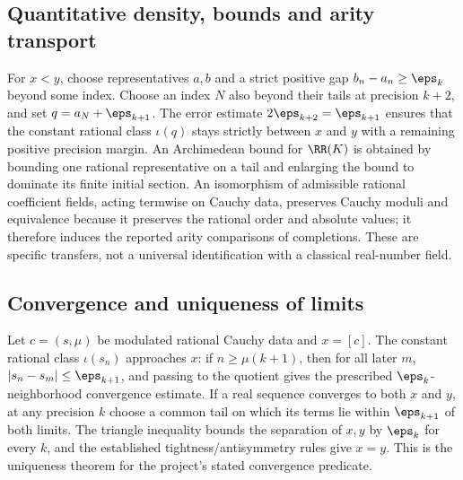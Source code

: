\subsection{Quantitative density, bounds and arity transport}\label{supp:12-7}
\par{}\par\smallskip

For $x<y$, choose representatives $a,b$ and a strict positive gap $b_n-a_n\ge\eps_k$ beyond some index. Choose an index $N$ also beyond their tails at precision $k+2$, and set $q=a_N+\eps_{k+1}$. The error estimate $2\eps_{k+2}=\eps_{k+1}$ ensures that the constant rational class $\iota(q)$ stays strictly between $x$ and $y$ with a remaining positive precision margin. An Archimedean bound for $\RR(K)$ is obtained by bounding one rational representative on a tail and enlarging the bound to dominate its finite initial section. An isomorphism of admissible rational coefficient fields, acting termwise on Cauchy data, preserves Cauchy moduli and equivalence because it preserves the rational order and absolute values; it therefore induces the reported arity comparisons of completions. These are specific transfers, not a universal identification with a classical real-number field.

\subsection{Convergence and uniqueness of limits}\label{supp:13-1}
\par{}\par\smallskip

Let $c=(s,\mu)$ be modulated rational Cauchy data and $x=[c]$. The constant rational class $\iota(s_n)$ approaches $x$: if $n\ge\mu(k+1)$, then for all later $m$, $|s_n-s_m|\le\eps_{k+1}$, and passing to the quotient gives the prescribed $\eps_k$-neighborhood convergence estimate. If a real sequence converges to both $x$ and $y$, at any precision $k$ choose a common tail on which its terms lie within $\eps_{k+1}$ of both limits. The triangle inequality bounds the separation of $x,y$ by $\eps_k$ for every $k$, and the established tightness/antisymmetry rules give $x=y$. This is the uniqueness theorem for the project's stated convergence predicate.

